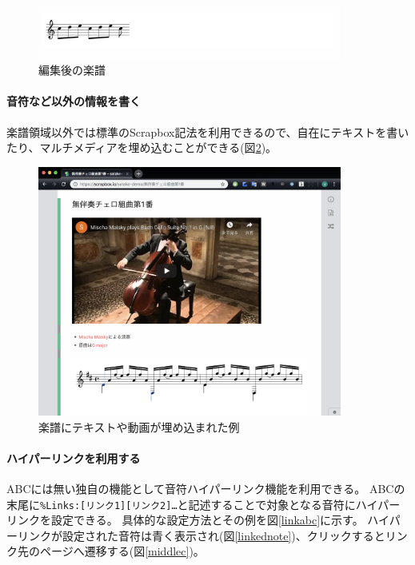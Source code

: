 \begin{figure}[H]
\centering
\includegraphics[width=10cm]{images/editedabc.png}
\caption{編集後の楽譜}
\label{editedabc}
\end{figure}


\paragraph*{音符など以外の情報を書く}
楽譜領域以外では標準のScrapbox記法を利用できるので、自在にテキストを書いたり、マルチメディアを埋め込むことができる(図\ref{scoreandtext})。

\begin{figure}[H]
\centering
\includegraphics[width=10cm]{images/scoreandtext.png}
\caption{楽譜にテキストや動画が埋め込まれた例}
\label{scoreandtext}
\end{figure}


\paragraph*{ハイパーリンクを利用する}
ABCには無い独自の機能として音符ハイパーリンク機能を利用できる。
ABCの末尾に\texttt{\%Links:[リンク1][リンク2]…}と記述することで対象となる音符にハイパーリンクを設定できる。
具体的な設定方法とその例を図\ref{linkabc}に示す。
ハイパーリンクが設定された音符は青く表示され(図\ref{linkednote})、クリックするとリンク先のページへ遷移する(図\ref{middlec})。

